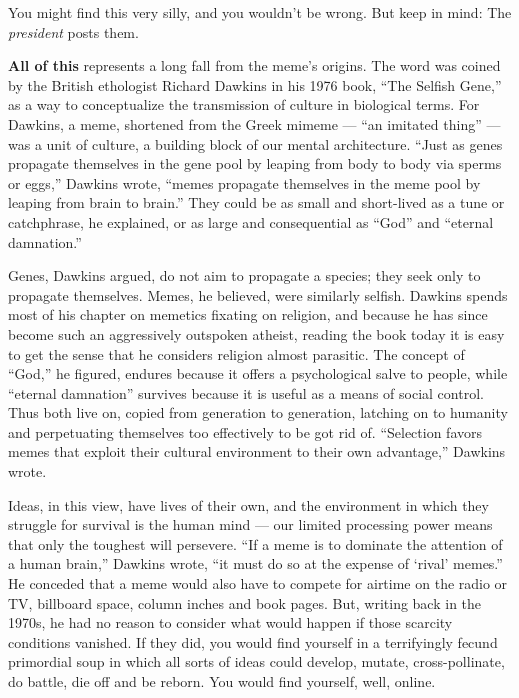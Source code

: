 You might find this very silly, and you wouldn't be wrong. But keep in
mind: The \emph{president} posts them.

\textbf{All of this} represents a long fall from the meme's origins. The
word was coined by the British ethologist Richard Dawkins in his 1976
book, ``The Selfish Gene,'' as a way to conceptualize the transmission
of culture in biological terms. For Dawkins, a meme, shortened from the
Greek mimeme --- ``an imitated thing'' --- was a unit of culture, a
building block of our mental architecture. ``Just as genes propagate
themselves in the gene pool by leaping from body to body via sperms or
eggs,'' Dawkins wrote, ``memes propagate themselves in the meme pool by
leaping from brain to brain.'' They could be as small and short-lived as
a tune or catchphrase, he explained, or as large and consequential as
``God'' and ``eternal damnation.''

Genes, Dawkins argued, do not aim to propagate a species; they seek only
to propagate themselves. Memes, he believed, were similarly selfish.
Dawkins spends most of his chapter on memetics fixating on religion, and
because he has since become such an aggressively outspoken atheist,
reading the book today it is easy to get the sense that he considers
religion almost parasitic. The concept of ``God,'' he figured, endures
because it offers a psychological salve to people, while ``eternal
damnation'' survives because it is useful as a means of social control.
Thus both live on, copied from generation to generation, latching on to
humanity and perpetuating themselves too effectively to be got rid of.
``Selection favors memes that exploit their cultural environment to
their own advantage,'' Dawkins wrote.

Ideas, in this view, have lives of their own, and the environment in
which they struggle for survival is the human mind --- our limited
processing power means that only the toughest will persevere. ``If a
meme is to dominate the attention of a human brain,'' Dawkins wrote,
``it must do so at the expense of `rival' memes.'' He conceded that a
meme would also have to compete for airtime on the radio or TV,
billboard space, column inches and book pages. But, writing back in the
1970s, he had no reason to consider what would happen if those scarcity
conditions vanished. If they did, you would find yourself in a
terrifyingly fecund primordial soup in which all sorts of ideas could
develop, mutate, cross-pollinate, do battle, die off and be reborn. You
would find yourself, well, online.

